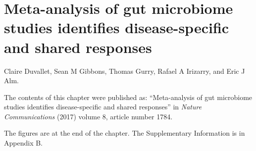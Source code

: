 
\graphicspath{{meta-analysis/figures/}}

\chapter{Meta-analysis of gut microbiome studies identifies disease-specific and shared responses}\label{chap:meta-analysis}

Claire Duvallet, Sean M Gibbons, Thomas Gurry, Rafael A Irizarry, and Eric J Alm.

\bigskip
\bigskip
\noindent
The contents of this chapter were published as: ``Meta-analysis of gut microbiome studies identifies disease-specific and shared responses'' in \textit{Nature Communications} (2017) volume 8, article number 1784.

\bigskip
\bigskip
\noindent
The figures are at the end of the chapter. The Supplementary Information is in Appendix B.

\clearpage

